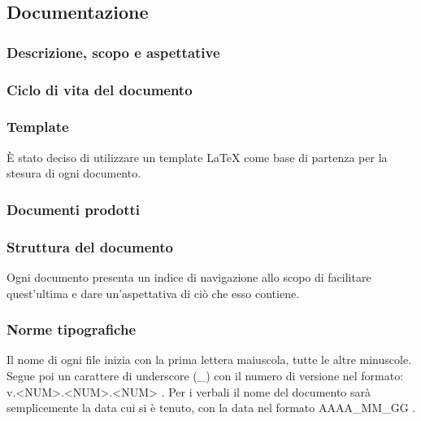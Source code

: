 \subsection{Documentazione}

\subsubsection{Descrizione, scopo e aspettative}

\subsubsection{Ciclo di vita del documento}

\subsubsection{Template}
È stato deciso di utilizzare un template LaTeX %
come base di partenza per la stesura di ogni documento.

\subsubsection{Documenti prodotti}



\subsubsection{Struttura del documento}



        Ogni documento presenta un indice di navigazione allo scopo di facilitare quest'ultima e
        dare un'aspettativa di ciò che esso contiene.



\subsubsection{Norme tipografiche}

    Il nome di ogni file inizia con la prima lettera maiuscola, tutte le altre minuscole.
    Segue poi un carattere di underscore (_) con il numero di versione nel formato: v.<NUM>.<NUM>.<NUM> .
    Per i verbali il nome del documento sarà semplicemente la data cui si è tenuto, con la data nel formato
    AAAA_MM_GG .


